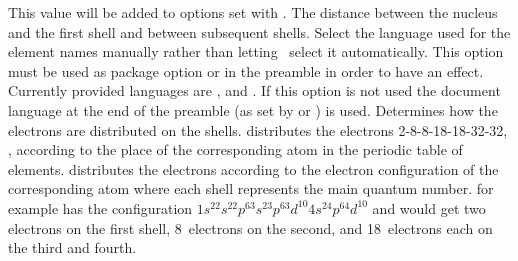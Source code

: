 \documentclass[load-preamble+]{cnltx-doc}
\begin{document}
\begin{options}
  \Default
    This value will be added to options set with .
  \Default{1em}
    The distance between the nucleus and the first shell and between subsequent
    shells.
  \Default
    Select the language used for the element names manually
    rather than letting \BOHR\ select it automatically.  This option must be
    used as package option or in the preamble in order to have an effect.
    Currently provided languages are ,  and
    .  If this option is not used the document language at the
    end of the preamble (as set by  or ) is
    used.
    Determines how the electrons are distributed on the
    shells.   distributes the electrons 2-8-8-18-18-32-32, \ie,
    according to the place of the corresponding atom in the periodic table of
    elements.   distributes the electrons according to the
    electron configuration of the corresponding atom where each shell
    represents the main quantum number.   for example has the
    configuration $1s^22s^22p^63s^23p^63d^{10}4s^24p^64d^{10}$ and would get
    two electrons on the first shell, 8~electrons on the second, and
    18~electrons each on the third and fourth.
\end{options}

\begin{example}
   
\end{example}

\begin{example}
   
\end{example}

\begin{example}
   
\end{example}

\end{document}
